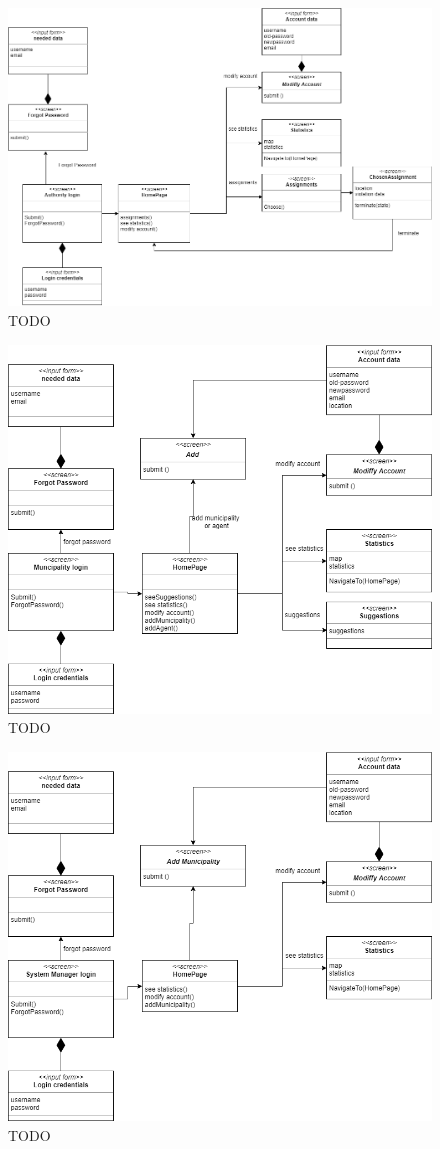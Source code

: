 \begin{figure}[h]
\centering
\includegraphics[width=\textwidth]{Images/ux2-correct.png}
\caption{\label{fig:ls}TODO }
\end{figure}
\begin{figure}[h]
\centering
\includegraphics[width=\textwidth]{Images/ux3-correct.png}
\caption{\label{fig:ls}TODO }
\end{figure}
\begin{figure}[h]
\centering
\includegraphics[width=\textwidth]{Images/ux4-correct.png}
\caption{\label{fig:ls}TODO }
\end{figure}
